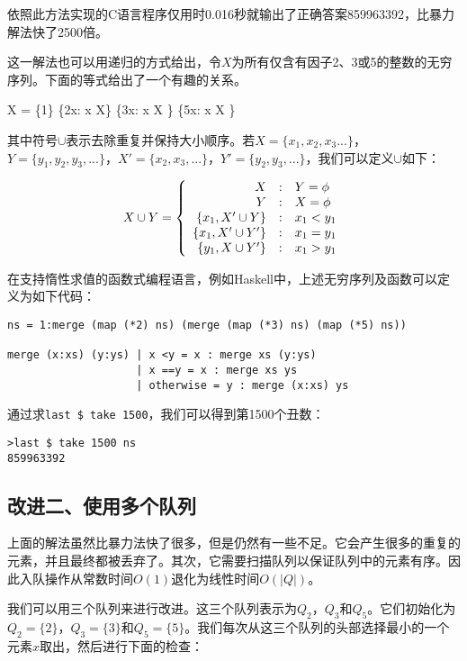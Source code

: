 \documentclass{article}
\begin{document}
依照此方法实现的C语言程序仅用时0.016秒就输出了正确答案859963392，比暴力解法快了2500倍。

这一解法也可以用递归的方式给出，令$X$为所有仅含有因子2、3或5的整数的无穷序列。下面的等式给出了一个有趣的关系。

\be
  X = \{1\} \cup \{2x: \forall x \in X\} \cup \{3x: \forall x \in X \} \cup \{5x: \forall x \in X \}
\ee

其中符号$\cup$表示去除重复并保持大小顺序。若$X=\{x_1, x_2, x_3...\}$，$Y=\{y_1, y_2, y_3, ...\}$，$X' = \{x_2, x_3, ...\}$，$Y'=\{y_2, y_3, ...\}$，我们可以定义$\cup$如下：

\[
X \cup Y = \left \{
  \begin{array}{r@{\quad:\quad}l}
  X & Y = \phi \\
  Y & X = \phi \\
  \{ x_1, X' \cup Y \} & x_1 < y_1 \\
  \{ x_1, X' \cup Y' \} & x_1 = y_1 \\
  \{ y_1, X \cup Y' \} & x_1 > y_1
  \end{array}
\right.
\]

在支持惰性求值的函数式编程语言，例如Haskell中，上述无穷序列及函数可以定义为如下代码：

\begin{lstlisting}[style=Haskell]
ns = 1:merge (map (*2) ns) (merge (map (*3) ns) (map (*5) ns))

merge (x:xs) (y:ys) | x <y = x : merge xs (y:ys)
                    | x ==y = x : merge xs ys
                    | otherwise = y : merge (x:xs) ys
\end{lstlisting}

通过求\texttt{last \$ take 1500}，我们可以得到第1500个丑数：

\begin{verbatim}
>last $ take 1500 ns
859963392
\end{verbatim}

\subsection{改进二、使用多个队列}
上面的解法虽然比暴力法快了很多，但是仍然有一些不足。它会产生很多的重复的元素，并且最终都被丢弃了。其次，它需要扫描队列以保证队列中的元素有序。因此入队操作从常数时间$O(1)$退化为线性时间$O(|Q|)$。

我们可以用三个队列来进行改进。这三个队列表示为$Q_2$，$Q_3$和$Q_5$。它们初始化为$Q_2=\{ 2 \}$，$Q_3 = \{ 3\}$和$Q_5 = \{ 5 \}$。我们每次从这三个队列的头部选择最小的一个元素$x$取出，然后进行下面的检查：
\end{document}
